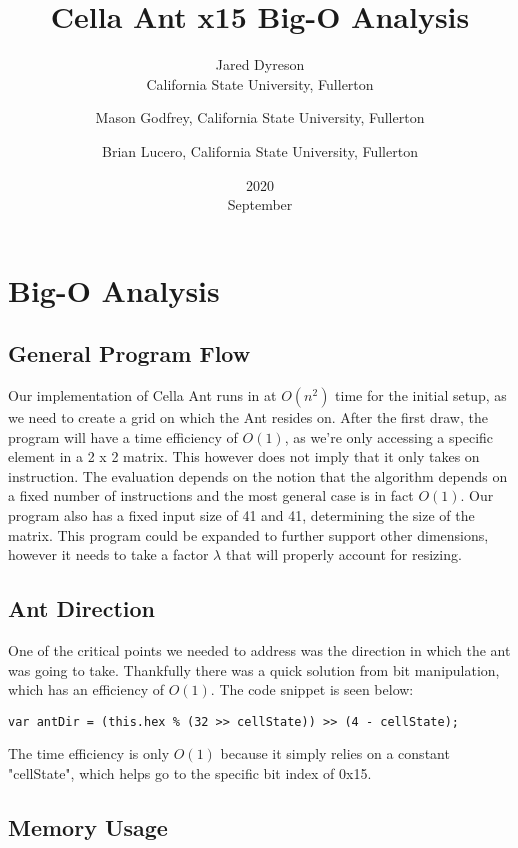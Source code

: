 \documentclass{article}
\title{Cella Ant x15 Big-O Analysis}
\date{2020\\ September}
\author{Jared Dyreson\\ California State University, Fullerton 
\and Mason Godfrey, California State University, Fullerton
\and Brian Lucero, California State University, Fullerton}
\begin{document}
\maketitle
\tableofcontents
\newpage

\section{Big-O Analysis}

\subsection{General Program Flow}

Our implementation of Cella Ant runs in at $O(n^2)$ time for the initial setup, as we need to create a grid on which the Ant resides on.
After the first draw, the program will have a time efficiency of $O(1)$, as we're only accessing a specific element in a 2 x 2 matrix.
This however does not imply that it only takes on instruction.
The evaluation depends on the notion that the algorithm depends on a fixed number of instructions and the most general case is in fact $O(1)$.
Our program also has a fixed input size of 41 and 41, determining the size of the matrix.
This program could be expanded to further support other dimensions, however it needs to take a factor $\lambda$ that will properly account for resizing.

\subsection{Ant Direction}

\begin{flushleft}
One of the critical points we needed to address was the direction in which the ant was going to take.
Thankfully there was a quick solution from bit manipulation, which has an efficiency of $O(1)$.
The code snippet is seen below:

\begin{lstlisting}
var antDir = (this.hex % (32 >> cellState)) >> (4 - cellState);
\end{lstlisting}

The time efficiency is only $O(1)$ because it simply relies on a constant "cellState", which helps go to the specific bit index of 0x15.
\end{flushleft}

\subsection{Memory Usage}
\end{document}

